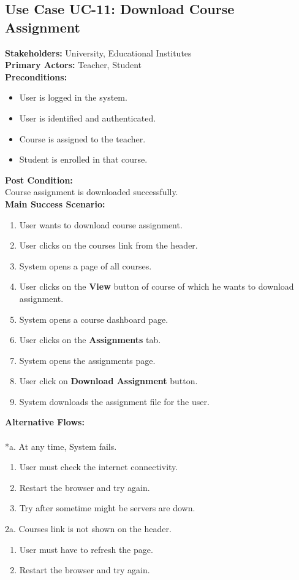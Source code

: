 \subsection{Use Case UC-11: Download Course Assignment}
\textbf{Stakeholders: } University, Educational Institutes \\
\textbf{Primary Actors: }Teacher, Student \\
\textbf{Preconditions:}
\begin{itemize}
\item User is logged in the system.
\item User is identified and authenticated.
\item Course is assigned to the teacher.
\item Student is enrolled in that course.
\end{itemize}
\textbf{Post Condition: }\\
Course assignment is downloaded successfully.\\
\textbf{Main Success Scenario:}
\begin{enumerate}
\item User wants to download course assignment.
\item User clicks on the courses link from the header.
\item System opens a page of all courses.
\item User clicks on the \textbf{View} button of course of which he wants to download assignment.
\item System opens a course dashboard page.
\item User clicks on the \textbf{Assignments} tab.
\item System opens the assignments page.
\item User click on \textbf{Download Assignment} button.
\item System downloads the assignment file for the user.
\end{enumerate}
\textbf{Alternative Flows:}\\
\\
*a. At any time, System fails.
\begin{enumerate}
\item User must check the internet connectivity.
\item Restart the browser and try again.
\item Try after sometime might be servers are down.
\end{enumerate}
2a. Courses link is not shown on the header.
\begin{enumerate}
\item User must have to refresh the page.
\item Restart the browser and try again.
\end{enumerate} 
